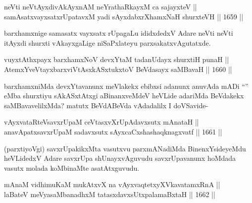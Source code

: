 
\begin{shl}
neVti neVtAyxdivAkAyxnAM neYrathaRkayxM ca sajayxteV || \\
samAsatxvayxsatxrUpatavxM yadi sAyxdabxrXhamxNaH shurxteVH ||  1659 ||  
\end{shl}

\begin{artha}
barxhamxnige samasatx vayxsatx rUpagaLu ididxdedxV Adare neVti neVti itAyxdi shurxti vAkayxgaLige niSaPxlateyu parxsakatxvAgutatxde.
\end{artha}


\begin{shl}
vuyxtAthxpayx barxhamxNoV devxYtaM tadanUdayx shurxtiH punaH || \\
AtemxYveVtayxbarxviVtAsxkASxtukxtoV BeVdasayx saMBavaH ||  1660 ||  
\end{shl}

\begin{artha}
barxhamxniMda devxYtavanunx meVlakekx ebibxsi adanunx anuvAda mADi ``\stext'' eMba shurxtiyu sAkASxtAtxgi aBinanxveMdeV heVLide adariMda BeVdakekx saMBavavelilxMda? matutx BeVdABeVda vAdadalilx I doVSavide-
\end{artha}

\begin{shl}
vAyxvataRteV\s savxrUpaM ceVtasxvXrUpAdavxsutx mAnataH || \\
anavApatxsavxrUpaM sadavxsutx sAyxcaCxshashaqknagxvatf ||  1661 ||  
\end{shl}

\begin{artha}
(parxtiyoVgi) savxrUpakikxMta vasutxvu parxmANadiMda BinenxYsideyeMdu heVLidedxV Adare savxrUpa shUnayxvAguvudu savxrUpavanunx hoMdada vasutx molada koMbinaMte asatAtxguvudu.
\end{artha}


\begin{shl}
mAnaM vidhimuKaM mukAtxvX na vAyxvaqtetxyXVkavatamxRnA || \\
laBateV meVyasaMbanadhxM tatasxdavxsUtxpalamaBxtaH ||  1662 ||  
\end{shl}

